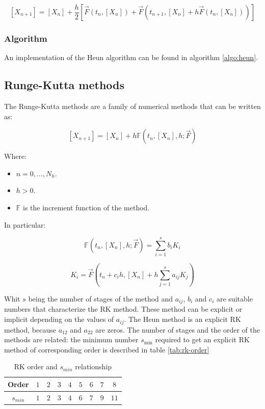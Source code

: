   $$[X_{n+1}] = [X_n] + \frac{h}{2}[\vec{F}(t_n, [X_n]) + \vec{F}(t_{n+1}, [X_{n}]+h\vec{F}(t_n, [X_n]))]$$

    \subsubsection{Algorithm}
    An implementation of the Heun algorithm can be found in algorithm \ref{algo:heun}.

    

  \subsection{Runge-Kutta methods}
  The Runge-Kutta methods are a family of numerical methods that can be written as:

  $$[X_{n+1}] = [X_n] + h\mathbb{F}(t_n, [X_n], h;\vec{F})$$

  Where:

  \begin{multicols}{2}
    \begin{itemize}
      \item $n = 0, \dots, N_h$.
      \item $h>0$.
      \item $\mathbb{F}$ is the increment function of the method.
    \end{itemize}
  \end{multicols}

  In particular:

  $$\mathbb{F}(t_n, [X_n], h;\vec{F}) = \sum\limits_{i=1}^s b_iK_i$$

  $$K_i = \vec{F}(t_n + c_ih, [X_n] + h\sum\limits_{j=1}^sa_{ij}K_j)$$

  Whit $s$ being the number of stages of the method and $a_{ij}$, $b_i$ and $c_i$ are suitable numbers that characterize the RK method.
  These method can be explicit or implicit depending on the values of $a_{ij}$.
  The Heun method is an explicit RK method, because $a_{12}$ and $a_{22}$ are zeros.
  The number of stages and the order of the methods are related: the minimum number $s_{\min}$ required to get an explicit RK method of corresponding order is described in table \ref{tab:rk-order}

  \begin{table}[H]
    \centering
    \begin{tabular}{c | c c c c c c c c }
      Order & $1$ & $2$ & $3$ & $4$ & $5$ & $6$ & $7$ & $8$\\
      \hline
      $s_{min}$ & $1$ & $2$ & $3$ & $4$ & $6$ & $7$ & $9$ & $11$\\
    \end{tabular}
    \caption{RK order and $s_{min}$ relationship}
    \label{tag:rk-order}
  \end{table}

